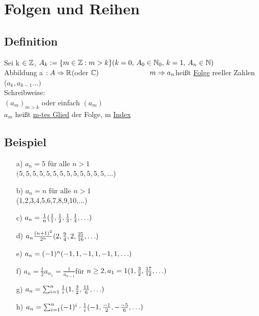 \section{Folgen und Reihen}
\subsection{Definition}
Sei k $\in \mathbb{Z}$,
$A_k := \{ m \in \mathbb{Z} : m > k\}\\
(k = 0,\, A_0 \in \mathbb{N}_0,\, k = 1,\, A_n \in \mathbb{N})$\\
Abbildung a $: A \Rightarrow \mathbb{R} $(oder $\mathbb{C})\\
\hspace*{2.5cm} m \Rightarrow a_n\\
$hei\ss t \underline{Folge} reeller Zahlen\\
\hspace*{2.5cm} ($a_k,a_{k-1} \ldots)$\\
Schreibweise:\\
$(a_m)_{m>k}$ oder einfach $(a_m)$\\
$a_m$ hei\ss t \underline{m-tes Glied} der Folge, m \underline{Index}\\
\subsection{Beispiel}
\begin{enumerate}
\item[a)] $a_n = 5$ f\"ur alle $n > 1$\\
$(5,5,5,5,5,5,5,5,5,5,5,5,5,\ldots$)\\
\item[b)] $a_n = n$ f\"ur alle $n>1$\\
(1,2,3,4,5,6,7,8,9,10,$\ldots$)\\
\item[c)] $a_n = \frac{1}{n}\\
(\frac{1}{1}, \frac{1}{2} ,\frac{1}{3}, \frac{1}{4}, \ldots)$\\
\item[d)]$a_n \frac{(n+1)^2}{2^n}\\
(2, \frac{9}{4},2,\frac{25}{16}, \ldots)$\\
\item[e)]$a_n = (-1)^n\\
(-1,1,-1,1,-1,1,\ldots)\\ $
\item[f)]$a_n = \frac{1}{2}a_{n_1} = \frac{1}{a_{n-1}} $f\"ur $n\geq 2,
a_1 =1\\
(1,\frac{3}{2},\frac{17}{12}, \ldots)$
\item[g)]$a_n = \sum_{i=1}^{n} \frac{1}{i}\\
(1,\frac{3}{2}, \frac{11}{6},\ldots)$
\item[h)]$a_n = \sum_{i=1}^{n} (-1)^i\cdot \frac{1}{i}\\
(-1,\frac{-1}{2},-\frac{-5}{6},\ldots)$
\end{enumerate}
